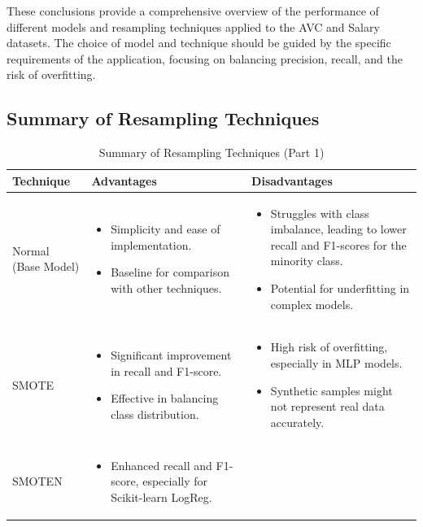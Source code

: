 \documentclass[a4paper,12pt]{article}
\begin{document}
These conclusions provide a comprehensive overview of the performance of different models and resampling techniques applied to the AVC and Salary datasets. The choice of model and technique should be guided by the specific requirements of the application, focusing on balancing precision, recall, and the risk of overfitting.

\newpage

\subsection{Summary of Resampling Techniques}

\begin{table}[h!]
    \centering
    \caption{Summary of Resampling Techniques (Part 1)}
    \begin{tabularx}{\textwidth}{|l|X|X|}
    \hline
    \textbf{Technique} & \textbf{Advantages} & \textbf{Disadvantages} \\
    \hline
    Normal (Base Model) & 
    \begin{itemize}
        \item Simplicity and ease of implementation.
        \item Baseline for comparison with other techniques.
    \end{itemize} & 
    \begin{itemize}
        \item Struggles with class imbalance, leading to lower recall and F1-scores for the minority class.
        \item Potential for underfitting in complex models.
    \end{itemize} \\
    \hline
    SMOTE & 
    \begin{itemize}
        \item Significant improvement in recall and F1-score.
        \item Effective in balancing class distribution.
    \end{itemize} & 
    \begin{itemize}
        \item High risk of overfitting, especially in MLP models.
        \item Synthetic samples might not represent real data accurately.
    \end{itemize} \\
    \hline
    SMOTEN & 
    \begin{itemize}
        \item Enhanced recall and F1-score, especially for Scikit-learn LogReg.

\end{itemize}
\end{tabularx}
\end{table}
\end{document}
